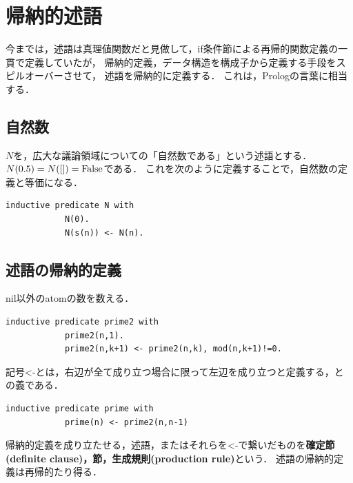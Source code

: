 \documentclass[uplatex, dvipdfmx]{jsreport}
\begin{document}
\section{帰納的述語}

今までは，述語は真理値関数だと見做して，if条件節による再帰的関数定義の一貫で定義していたが，
帰納的定義，データ構造を構成子から定義する手段をスピルオーバーさせて，
述語を帰納的に定義する．
これは，Prologの言葉に相当する．

\subsection{自然数}

\begin{definition}
    $N$を，広大な議論領域についての「自然数である」という述語とする．$N(0.5)=N([])=\mathrm{False}$である．
    これを次のように定義することで，自然数の定義と等価になる．
    \begin{lstlisting}[caption=natural number]
        inductive predicate N with
            N(0).
            N(s(n)) <- N(n).
    \end{lstlisting}
\end{definition}

\subsection{述語の帰納的定義}

\begin{example}[k以下での因数を持たない]
    nil以外のatomの数を数える．
    \begin{lstlisting}[caption=prime2]
        inductive predicate prime2 with
            prime2(n,1).
            prime2(n,k+1) <- prime2(n,k), mod(n,k+1)!=0.
    \end{lstlisting}
    記号<-とは，右辺が全て成り立つ場合に限って左辺を成り立つと定義する，との義である．
    \begin{lstlisting}[caption=prime]
        inductive predicate prime with
            prime(n) <- prime2(n,n-1)
    \end{lstlisting}
\end{example}

\begin{definition}[述語の帰納的定義]
    帰納的定義を成り立たせる，述語，またはそれらを<-で繋いだものを\textbf{確定節(definite clause)，節，生成規則(production rule)}という．
    述語の帰納的定義は再帰的たり得る．
\end{definition}
\end{document}
